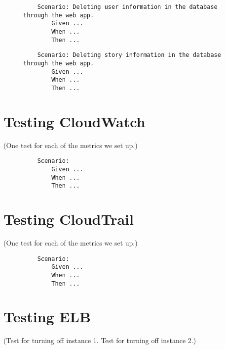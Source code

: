 \begin{figure}[!htbp]
    \centering
    \begin{verbatim}
    Scenario: Deleting user information in the database through the web app.
        Given ...
        When ...
        Then ...
    \end{verbatim}
    \label{fig:delete-user-data}
\end{figure}

\begin{figure}[!htbp]
    \centering
    \begin{verbatim}
    Scenario: Deleting story information in the database through the web app.
        Given ...
        When ...
        Then ...
    \end{verbatim}
    \label{fig:delete-story-data}
\end{figure}

\section{Testing CloudWatch}\label{sec:testing-cloudwatch}

(One test for each of the metrics we set up.)

\begin{figure}[!htbp]
    \centering
    \begin{verbatim}
    Scenario:
        Given ...
        When ...
        Then ...
    \end{verbatim}
    \label{fig:cloudwatch-}
\end{figure}

\section{Testing CloudTrail}\label{sec:testing-cloudtrail}

(One test for each of the metrics we set up.)

\begin{figure}[!htbp]
    \centering
    \begin{verbatim}
    Scenario:
        Given ...
        When ...
        Then ...
    \end{verbatim}
    \label{fig:cloudtrail-}
\end{figure}

\section{Testing ELB}\label{sec:testing-elb}

(Test for turning off instance 1. Test for turning off instance 2.)